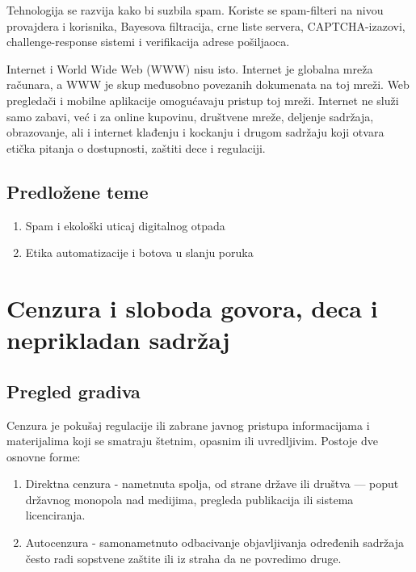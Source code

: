 \documentclass[12pt]{article}
\begin{document}
Tehnologija se razvija kako bi suzbila spam. Koriste se spam-filteri na nivou provajdera i korisnika, Bayesova filtracija, crne liste servera, CAPTCHA-izazovi, challenge-response sistemi i verifikacija adrese pošiljaoca.

Internet i World Wide Web (WWW) nisu isto. Internet je globalna mreža računara, a WWW je skup međusobno povezanih dokumenata na toj mreži. Web pregledači i mobilne aplikacije omogućavaju pristup toj mreži.
Internet ne služi samo zabavi, već i za online kupovinu, društvene mreže, deljenje sadržaja, obrazovanje, ali i internet klađenju i kockanju i drugom sadržaju koji otvara etička pitanja o dostupnosti, zaštiti dece i regulaciji.

\subsection{Predložene teme}
\begin{enumerate}
    \item Spam i ekološki uticaj digitalnog otpada
    \item Etika automatizacije i botova u slanju poruka
\end{enumerate}

\section{Cenzura i sloboda govora, deca i neprikladan sadržaj}
\subsection{Pregled gradiva}
Cenzura je pokušaj regulacije ili zabrane javnog pristupa informacijama i materijalima koji se smatraju štetnim, opasnim ili uvredljivim.
Postoje dve osnovne forme:
\begin{enumerate}
  \item Direktna cenzura - nametnuta spolja, od strane države ili društva — poput državnog monopola nad medijima, pregleda publikacija ili sistema licenciranja.
  \item Autocenzura - samonametnuto odbacivanje objavljivanja određenih sadržaja često radi sopstvene zaštite ili iz straha da ne povredimo druge.
\end{enumerate}
\end{document}
